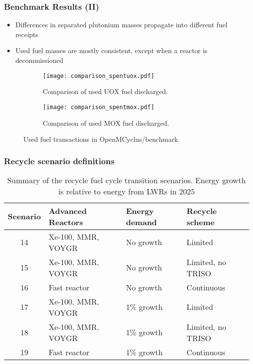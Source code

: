 \begin{frame}
    \frametitle{Benchmark Results (II)}
        \begin{itemize}
            \item Differences in separated plutonium masses 
                  propagate into different fuel receipts 
            \item Used fuel masses are mostly consistent, except 
                  when a reactor is decommissioned
        \end{itemize}
        \begin{figure}
            \centering
            \begin{subfigure}{0.48\textwidth}
                \texttt{[image: comparison\_spentuox.pdf]}
                \caption{Comparison of used UOX fuel discharged.}
            \end{subfigure}
            \hfill
            \begin{subfigure}{0.48\textwidth}
                \texttt{[image: comparison\_spentmox.pdf]}
                \caption{Comparison of used MOX fuel discharged.}
            \end{subfigure}
            \caption{Used fuel transactions in OpenMCyclus/\Cycamore benchmark}
            \label{fig:spentfuel_benchmark}
        \end{figure}

\end{frame}

\begin{frame}
    \frametitle{Recycle scenario definitions}
    \begin{table}[ht]
        \centering
        \caption{Summary of the recycle fuel cycle transition scenarios.
        Energy growth is relative to energy from \glspl{LWR} in 2025}
        \label{tab:scenarios_recycle}
        \begin{tabular}{c l l l}
            \hline
            Scenario & Advanced Reactors & Energy demand & Recycle scheme\\\hline
            \rowcolor{lightgray}14 & Xe-100, MMR, VOYGR & No growth & Limited \\
            \rowcolor{lightgray}15 & Xe-100, MMR, VOYGR & No growth & Limited, no TRISO\\
            \rowcolor{lightgray}16 & Fast reactor & No growth & Continuous \\
            \rowcolor{lightpink}17 & Xe-100, MMR, VOYGR & 1\% growth & Limited \\
            \rowcolor{lightpink}18 & Xe-100, MMR, VOYGR & 1\% growth & Limited, no TRISO\\
            \rowcolor{lightpink}19 & Fast reactor & 1\% growth & Continuous\\
            \hline
    \end{tabular}
    \end{table}
\end{frame}

